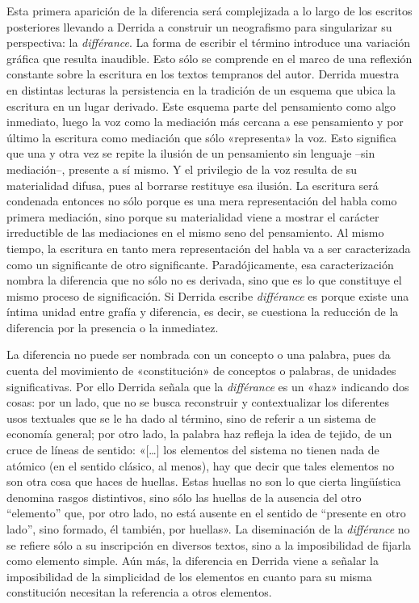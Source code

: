 Esta primera aparición de la diferencia será complejizada a lo largo de los escritos posteriores llevando a Derrida a construir un neografismo para singularizar su perspectiva: la \emph{différance}. La forma de escribir el término introduce una variación gráfica que resulta inaudible. Esto sólo se comprende en el marco de una reflexión constante sobre la escritura en los textos tempranos del autor. Derrida muestra en distintas lecturas la persistencia en la tradición de un esquema que ubica la escritura en un lugar derivado. Este esquema parte del pensamiento como algo inmediato, luego la voz como la mediación más cercana a ese pensamiento y por último la escritura como mediación que sólo «representa» la voz. Esto significa que una y otra vez se repite la ilusión de un pensamiento sin lenguaje --sin mediación--, presente a sí mismo. Y el privilegio de la voz resulta de su materialidad difusa, pues al borrarse restituye esa ilusión. La escritura será condenada entonces no sólo porque es una mera representación del habla como primera mediación, sino porque su materialidad viene a mostrar el carácter irreductible de las mediaciones en el mismo seno del pensamiento. Al mismo tiempo, la escritura en tanto mera representación del habla va a ser caracterizada como un significante de otro significante. Paradójicamente, esa caracterización nombra la diferencia que no sólo no es derivada, sino que es lo que constituye el mismo proceso de significación. Si Derrida escribe \emph{différance} es porque existe una íntima unidad entre grafía y diferencia, es decir, se cuestiona la reducción de la diferencia por la presencia o la inmediatez.

La diferencia no puede ser nombrada con un concepto o una palabra, pues da cuenta del movimiento de «constitución» de conceptos o palabras, de unidades significativas. Por ello Derrida señala que la \emph{différance }es un «haz» indicando dos cosas: por un lado, que no se busca reconstruir y contextualizar los diferentes usos textuales que se le ha dado al término, sino de referir a un sistema de economía general; por otro lado, la palabra haz refleja la idea de tejido, de un cruce de líneas de sentido: «{[}\ldots{]} los elementos del sistema no tienen nada de atómico (en el sentido clásico, al menos), hay que decir que tales elementos no son otra cosa que haces de huellas. Estas huellas no son lo que cierta lingüística denomina rasgos distintivos, sino sólo las huellas de la ausencia del otro ``elemento'' que, por otro lado, no está ausente en el sentido de ``presente en otro lado'', sino formado, él también, por huellas». La diseminación de la \emph{différance} no se refiere sólo a su inscripción en diversos textos, sino a la imposibilidad de fijarla como elemento simple. Aún más, la diferencia en Derrida viene a señalar la imposibilidad de la simplicidad de los elementos en cuanto para su misma constitución necesitan la referencia a otros elementos.

